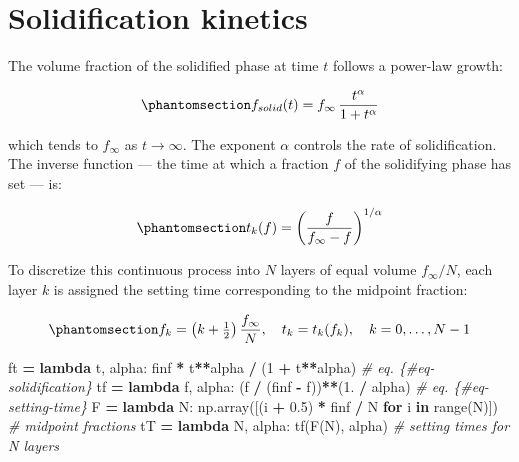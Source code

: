 \documentclass[
  a4paper,
  numbers=noendperiod,
  DIV=12]{scrreprt}
\newenvironment{Shaded}{\begin{snugshade}}{\end{snugshade}}
\newcommand{\BuiltInTok}[1]{#1}
\newcommand{\CommentTok}[1]{\textcolor[rgb]{0.56,0.35,0.01}{\textit{#1}}}
\newcommand{\ControlFlowTok}[1]{\textcolor[rgb]{0.13,0.29,0.53}{\textbf{#1}}}
\newcommand{\DecValTok}[1]{\textcolor[rgb]{0.00,0.00,0.81}{#1}}
\newcommand{\FloatTok}[1]{\textcolor[rgb]{0.00,0.00,0.81}{#1}}
\newcommand{\KeywordTok}[1]{\textcolor[rgb]{0.13,0.29,0.53}{\textbf{#1}}}
\newcommand{\NormalTok}[1]{#1}
\newcommand{\OperatorTok}[1]{\textcolor[rgb]{0.81,0.36,0.00}{\textbf{#1}}}
\begin{document}
\section{Solidification kinetics}\label{sec-solidification}

The volume fraction of the solidified phase at time \(t\) follows a
power-law growth:

\begin{equation}\protect\phantomsection\label{eq-solidification}{f_{solid}(t) = f_\infty\,\frac{t^\alpha}{1+t^\alpha}
}\end{equation}

which tends to \(f_\infty\) as \(t \to \infty\). The exponent \(\alpha\)
controls the rate of solidification. The inverse function --- the time
at which a fraction \(f\) of the solidifying phase has set --- is:

\begin{equation}\protect\phantomsection\label{eq-setting-time}{t_k(f) = \left(\frac{f}{f_\infty - f}\right)^{1/\alpha}
}\end{equation}

To discretize this continuous process into \(N\) layers of equal volume
\(f_\infty/N\), each layer \(k\) is assigned the setting time
corresponding to the midpoint fraction:

\begin{equation}\protect\phantomsection\label{eq-layers}{f_k = \left(k + \tfrac{1}{2}\right)\frac{f_\infty}{N}, \quad
t_k = t_k(f_k), \quad k = 0, \ldots, N-1
}\end{equation}

\begin{Shaded}
\begin{Highlighting}[]
\NormalTok{ft  }\OperatorTok{=} \KeywordTok{lambda}\NormalTok{ t, alpha: finf }\OperatorTok{*}\NormalTok{ t}\OperatorTok{**}\NormalTok{alpha }\OperatorTok{/}\NormalTok{ (}\DecValTok{1} \OperatorTok{+}\NormalTok{ t}\OperatorTok{**}\NormalTok{alpha)   }\CommentTok{\# eq. \{\#eq{-}solidification\}}
\NormalTok{tf  }\OperatorTok{=} \KeywordTok{lambda}\NormalTok{ f, alpha: (f }\OperatorTok{/}\NormalTok{ (finf }\OperatorTok{{-}}\NormalTok{ f))}\OperatorTok{**}\NormalTok{(}\FloatTok{1.} \OperatorTok{/}\NormalTok{ alpha)     }\CommentTok{\# eq. \{\#eq{-}setting{-}time\}}
\NormalTok{F   }\OperatorTok{=} \KeywordTok{lambda}\NormalTok{ N: np.array([(i }\OperatorTok{+} \FloatTok{0.5}\NormalTok{) }\OperatorTok{*}\NormalTok{ finf }\OperatorTok{/}\NormalTok{ N }\ControlFlowTok{for}\NormalTok{ i }\KeywordTok{in} \BuiltInTok{range}\NormalTok{(N)])   }\CommentTok{\# midpoint fractions}
\NormalTok{tT  }\OperatorTok{=} \KeywordTok{lambda}\NormalTok{ N, alpha: tf(F(N), alpha)                    }\CommentTok{\# setting times for N layers}
\end{Highlighting}
\end{Shaded}
\end{document}
